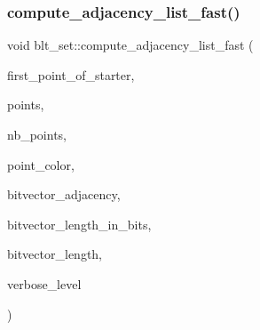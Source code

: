 \subsubsection{\texorpdfstring{compute\+\_\+adjacency\+\_\+list\+\_\+fast()}{compute\_adjacency\_list\_fast()}}
{\footnotesize\ttfamily void blt\+\_\+set\+::compute\+\_\+adjacency\+\_\+list\+\_\+fast (\begin{DoxyParamCaption}\item[{\mbox{\hyperlink{galois_8h_a09fddde158a3a20bd2dcadb609de11dc}{I\+NT}}}]{first\+\_\+point\+\_\+of\+\_\+starter,  }\item[{\mbox{\hyperlink{galois_8h_a09fddde158a3a20bd2dcadb609de11dc}{I\+NT}} $\ast$}]{points,  }\item[{\mbox{\hyperlink{galois_8h_a09fddde158a3a20bd2dcadb609de11dc}{I\+NT}}}]{nb\+\_\+points,  }\item[{\mbox{\hyperlink{galois_8h_a09fddde158a3a20bd2dcadb609de11dc}{I\+NT}} $\ast$}]{point\+\_\+color,  }\item[{\mbox{\hyperlink{galois_8h_a122c4acf389c050379f00341fdcd5812}{U\+B\+Y\+TE}} $\ast$\&}]{bitvector\+\_\+adjacency,  }\item[{\mbox{\hyperlink{galois_8h_a09fddde158a3a20bd2dcadb609de11dc}{I\+NT}} \&}]{bitvector\+\_\+length\+\_\+in\+\_\+bits,  }\item[{\mbox{\hyperlink{galois_8h_a09fddde158a3a20bd2dcadb609de11dc}{I\+NT}} \&}]{bitvector\+\_\+length,  }\item[{\mbox{\hyperlink{galois_8h_a09fddde158a3a20bd2dcadb609de11dc}{I\+NT}}}]{verbose\+\_\+level }\end{DoxyParamCaption})}

\mbox{\label{classblt__set_a6629b3a1a50c0f2736034abaea6f7d63}} 
